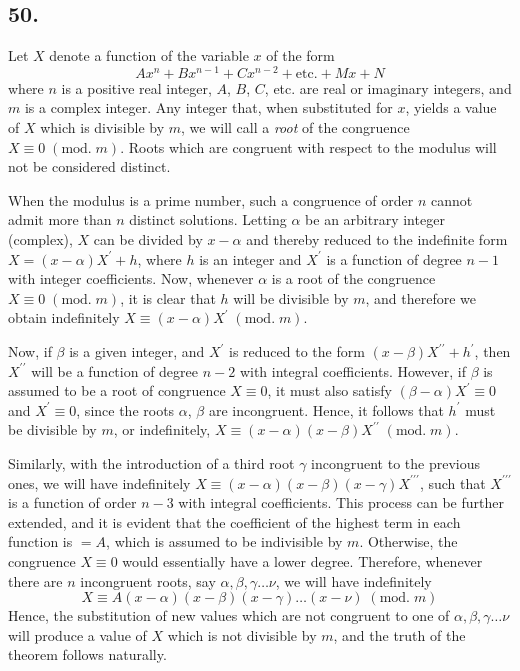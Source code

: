 \documentclass[twoside,12pt]{memoir}
\renewcommand{\pmod}[1]{\;(\textrm{mod.}\;#1)}
\begin{document}
\subsection*{50.}

Let \(X\) denote a function of the variable \(x\) of the form
\[A x^{n}+B x^{n-1}+C x^{n-2}+\text{etc{.}}+M x+N\]
where \(n\) is a positive real integer, \(A\), \(B\), \(C\), etc{.} are real or imaginary integers, and \(m\) is a complex integer.  Any integer that, when substituted for \(x\), yields a value of \(X\) which is divisible by \(m\), we will call a \textit{root} of the congruence \(X \equiv 0\pmod{m}\). Roots which are congruent with respect to the modulus will not be considered distinct.

When the modulus is a prime number, such a congruence of order \(n\) cannot admit more than \(n\) distinct solutions. Letting \(\alpha\) be an arbitrary integer (complex), \(X\) can be divided by \(x-\alpha\) and thereby reduced to the indefinite form \(X=(x-\alpha) X^{\prime}+h\), where \(h\) is an integer and \(X^{\prime}\) is a function of degree \(n-1\) with integer coefficients. Now, whenever \(\alpha\) is a root of the congruence \(X \equiv 0\pmod{m}\), it is clear that \(h\) will be divisible by \(m\), and therefore we obtain indefinitely \(X \equiv(x-\alpha) X^{\prime}\pmod{m}\).
%

Now, if \(\beta\) is a given integer, and \(X^{\prime}\) is reduced to the form \((x-\beta) X^{\prime \prime}+h^{\prime}\), then \(X^{\prime \prime}\) will be a function of degree \(n-2\) with integral coefficients. However, if \(\beta\) is assumed to be a root of congruence \({X} \equiv 0\), it must also satisfy \((\beta-\alpha) X^{\prime} \equiv 0\) and \(X^{\prime} \equiv 0\), since the roots \(\alpha\), \(\beta\) are incongruent. Hence, it follows that \(h^{\prime}\) must be divisible by \(m\), or indefinitely, \(X \equiv(x-\alpha)(x-\beta) X^{\prime \prime}\pmod{m}\).

Similarly, with the introduction of a third root \(\gamma\) incongruent to the previous ones, we will have indefinitely \(X \equiv(x-\alpha)(x-\beta)(x-\gamma) X^{\prime \prime \prime}\), such that \(X^{\prime \prime \prime}\) is a function of order \(n-3\) with integral coefficients. This process can be further extended, and it is evident that the coefficient of the highest term in each function is \(=A\), which is assumed to be indivisible by \(m\). Otherwise, the congruence \(X \equiv 0\) would essentially have a lower degree. Therefore, whenever there are \(n\) incongruent roots, say \(\alpha, \beta, \gamma \ldots \nu\), we will have indefinitely
\[X \equiv A(x-\alpha)(x-\beta)(x-\gamma) \ldots(x-\nu)\pmod{m}\]
Hence, the substitution of new values which are not congruent to one of \(\alpha, \beta, \gamma \ldots \nu\) will produce a value of \(X\) which is not divisible by \(m\), and the truth of the theorem follows naturally.
\end{document}
